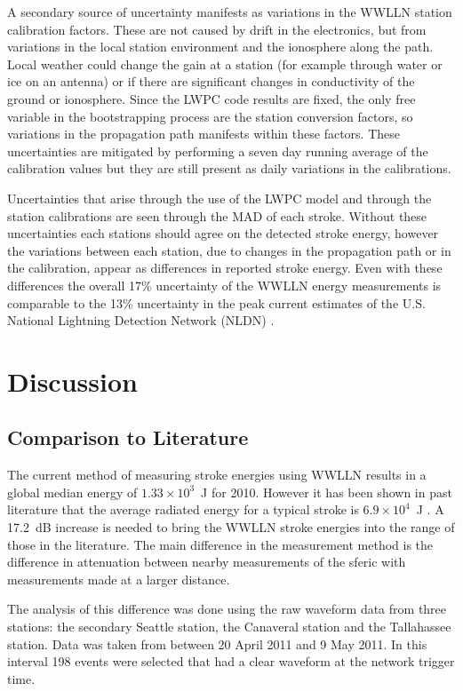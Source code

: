 A secondary source of uncertainty manifests as variations in the WWLLN station calibration factors.
These are not caused by drift in the electronics, but from variations in the local station environment and the ionosphere along the path.
Local weather could change the gain at a station (for example through water or ice on an antenna) or if there are significant changes in conductivity of the ground or ionosphere.
Since the LWPC code results are fixed, the only free variable in the bootstrapping process are the station conversion factors, so variations in the propagation path manifests within these factors.
These uncertainties are mitigated by performing a seven day running average of the calibration values but they are still present as daily variations in the calibrations.

Uncertainties that arise through the use of the LWPC model and through the station calibrations are seen through the MAD of each stroke.
Without these uncertainties each stations should agree on the detected stroke energy, however the variations between each station, due to changes in the propagation path or in the calibration, appear as differences in reported stroke energy.
Even with these differences the overall 17\% uncertainty of the WWLLN energy measurements is comparable to the 13\% uncertainty in the peak current estimates of the U.S. National Lightning Detection Network (NLDN) \citep{Nag2011}.

\section{Discussion}

\subsection{Comparison to Literature}

The current method of measuring stroke energies using WWLLN results in a global median energy of $1.33 \times 10^3$~J for 2010.
However it has been shown in past literature that the average radiated energy for a typical stroke is $6.9 \times 10^{4}$~J \citep{Taylor1963}.
A 17.2~dB increase is needed to bring the WWLLN stroke energies into the range of those in the literature.
The main difference in the measurement method is the difference in attenuation between nearby measurements of the sferic with measurements made at a larger distance.

The analysis of this difference was done using the raw waveform data from three stations: the secondary Seattle station, the Canaveral station and the Tallahassee station.
Data was taken from between 20 April 2011 and 9 May 2011. In this interval 198 events were selected that had a clear waveform at the network trigger time.

